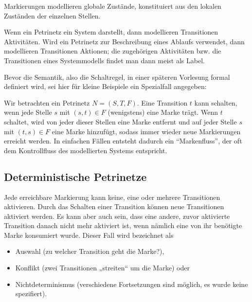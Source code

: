 Markierungen modellieren globale Zustände, konstituiert aus den lokalen Zuständen der einzelnen Stellen.


Wenn ein Petrinetz ein System darstellt, 
dann modellieren Transitionen Aktivitäten. Wird ein Petrinetz zur Beschreibung eines Ablaufs verwendet, dann modellieren Transitionen Aktionen; die zugehörigen Aktivitäten bzw. die Transitionen eines System\-modells findet man dann meist als Label.



Bevor die Semantik, also die Schaltregel, in einer späteren Vorlesung formal definiert wird, sei hier für kleine Beispiele ein Spezialfall angegeben:

Wir betrachten ein Petrinetz $N=(S,T,F)$. 
Eine Transition $t$ kann schalten, wenn jede Stelle $s$ mit $(s,t) \in F$ (wenigstens) eine Marke trägt. Wenn $t$ schaltet, wird von jeder dieser Stellen eine Marke entfernt und auf jeder Stelle $s$ mit $(t,s) \in F$ eine Marke hinzufügt, sodass immer wieder neue Markierungen erreicht werden. In einfachen Fällen entsteht dadurch ein "`Markenfluss"', der oft dem Kontrollfluss des modellierten Systems entspricht.


\subsection*{Deterministische Petrinetze}

Jede erreichbare Markierung kann keine, eine oder mehrere Transitionen aktivieren. Durch das Schalten einer Transition können neue Transitionen aktiviert werden. Es kann aber auch sein, dass eine andere, zuvor aktivierte Transition danach nicht mehr aktiviert ist, wenn nämlich eine von ihr benötigte Marke konsumiert wurde. Dieser Fall wird bezeichnet als 
\begin{itemize}
	\item Auswahl (zu welcher Transition geht die Marke?),
	\item Konflikt (zwei Transitionen „streiten“ um die Marke) oder
	\item Nichtdeterminismus (verschiedene Fortsetzungen sind möglich, es wurde keine spezifiert).
\end{itemize}

